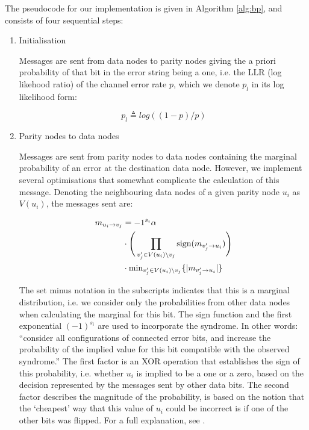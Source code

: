 The pseudocode for our implementation is given in Algorithm \ref{alg:bp}, and consists of four sequential steps:

\begin{enumerate}

	\item Initialisation
	
	Messages are sent from data nodes to parity nodes giving the a priori probability of that bit in the error string being a one, i.e. the LLR (log likehood ratio) of the channel error rate $p$, which we denote $p_l$ in its log likelihood form:

	\begin{equation}
		p_l \triangleq log( (1-p) / p )
	\end{equation}
	

	\item Parity nodes to data nodes
	
	Messages are sent from parity nodes to data nodes containing the marginal probability of an error at the destination data node. However, we implement several optimisations that somewhat complicate the calculation of this message. Denoting the neighbouring data nodes of a given parity node $u_i$ as $V(u_i)$, the messages sent are:
	
\begin{align}
	m_{u_i \rightarrow v_j} &= {-1^{s_i}} \alpha \\
	&\cdot \Bigg( \prod_{v_j' \in V(u_i) \setminus v_j} \mbox{sign} ( m_{v_j' \rightarrow u_i}) \Bigg) \\ 	
	&\cdot \mbox{min}_{v_j' \in V(u_i) \setminus v_j} \{ |m_{v_j' \rightarrow u_i}| \}
\end{align}

	The set minus notation in the subscripts indicates that this is a marginal distribution, i.e. we consider only the probabilities from other data nodes when calculating the marginal for this bit. The sign function and the first exponential $(-1)^{s_i}$ are used to incorporate the syndrome. In other words: ``consider all configurations of connected error bits, and increase the probability of the implied value for this bit compatible with the observed syndrome.''  The first factor is an XOR operation that establishes the sign of this probability, i.e. whether $u_i$ is implied to be a one or a zero, based on the decision represented by the messages sent by other data bits. The second factor describes the magnitude of the probability, is based on the notion that the `cheapest' way that this value of $u_i$ could be incorrect is if one of the other bits was flipped. For a full explanation, see \cite{kschischang2001factor}.
	

\end{enumerate}
